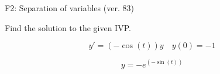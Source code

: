 \begin{exercise}
  \begin{exerciseTitle}F2: Separation of variables (ver. 83)\end{exerciseTitle}
  \begin{exerciseStatement}
    
Find the solution to the given IVP.

    
\[y'=( -\cos\left(t\right) )y\hspace{1em} y(0)= -1\]

  \end{exerciseStatement}
  \begin{exerciseAnswer}
    
\[y= -e^{\left(-\sin\left(t\right)\right)}\]

  \end{exerciseAnswer}
\end{exercise}